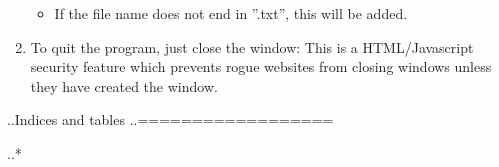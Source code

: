 \documentclass[letterpaper,10pt,english]{sphinxmanual}
\begin{document}
\begin{enumerate}
\begin{itemize}
\item {} 
If the file name does not end in ''.txt'', this will be
added.

\end{itemize}

\item {} 
To quit the program, just close the window: This is a HTML/Javascript security feature which
prevents rogue websites from closing windows unless they have created
the window.

\end{enumerate}

..Indices and tables
..==================

..* 



\renewcommand{\indexname}{Index}
\printindex
\end{document}
